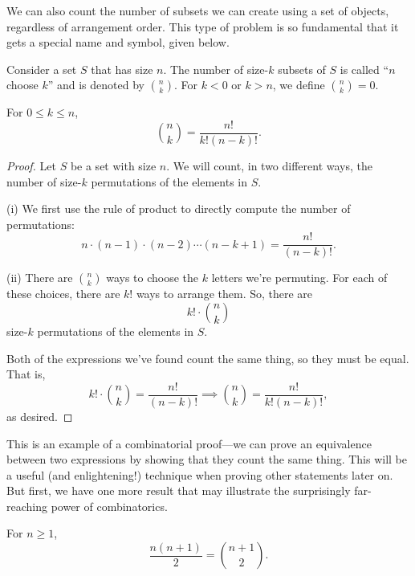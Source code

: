 \documentclass[../m055main.tex]{subfiles}
\begin{document}
We can also count the number of subsets we can create using a set of objects, regardless of arrangement order.
This type of problem is so fundamental that it gets a special name and symbol, given below.

\begin{definition}[Combination]
    Consider a set $S$ that has size $n$.
    The number of size-$k$ subsets of $S$ is called ``$n$ choose $k$'' and is denoted by $\binom{n}{k}$.
    For $k < 0$ or $k > n$, we define $\binom{n}{k} = 0$.
\end{definition}

\pagebreak

\begin{theorem}
    For $0 \leq k \leq n$,
    \[ \binom{n}{k} = \frac{n!}{k! (n-k)!}. \]
\end{theorem}

\begin{proof}
    Let $S$ be a set with size $n$.
    We will count, in two different ways, the number of size-$k$ permutations of the elements in $S$.
    \smallskip

    (i) We first use the rule of product to directly compute the number of permutations:
    \[ n \cdot (n-1) \cdot (n-2) \cdots (n-k+1) = \frac{n!}{(n-k)!}. \]

    (ii) There are $\binom{n}{k}$ ways to choose the $k$ letters we're permuting.
    For each of these choices, there are $k!$ ways to arrange them.
    So, there are
    \[ k! \cdot \binom{n}{k} \]
    size-$k$ permutations of the elements in $S$.
    \smallskip

    Both of the expressions we've found count the same thing, so they must be equal.
    That is,
    \[ k! \cdot \binom{n}{k} = \frac{n!}{(n-k)!} \implies \binom{n}{k} = \frac{n!}{k!(n-k)!}, \]
    as desired.
\end{proof}

This is an example of a combinatorial proof---we can prove an equivalence between two expressions by showing that they count the same thing.
This will be a useful (and enlightening!) technique when proving other statements later on.
But first, we have one more result that may illustrate the surprisingly far-reaching power of combinatorics.

\begin{theorem}[]
    For $n \geq 1$,
    \[ \frac{n(n+1)}{2} = \binom{n+1}{2}. \]
\end{theorem}
\end{document}
